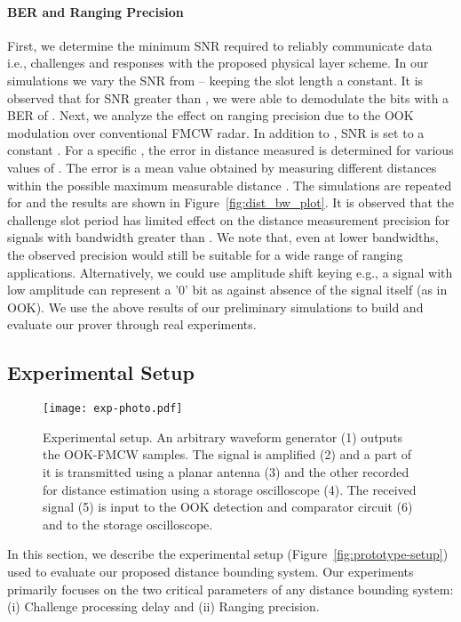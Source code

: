 \documentclass{sig-alternate-10pt}
\newcommand{\ie}{i.e.,\xspace}
\begin{document}
\paragraph{BER and Ranging Precision}
\label{sec:ber-ranging-precision}
First, we determine the minimum SNR required to reliably communicate data \ie
challenges and responses with the proposed physical layer scheme. In our
simulations we vary the SNR from -- keeping the slot length
 a constant. It is observed that for SNR greater than
, we were able to demodulate the bits with a BER of . Next,
we analyze the effect on ranging precision due to the OOK modulation over
conventional FMCW radar. In addition to , SNR is set to a constant
. For a specific , the error in distance measured is
determined for various values of . The error is a mean value obtained by
measuring  different distances within the possible maximum measurable
distance . The simulations are repeated for
 and the results are shown in
Figure~\ref{fig:dist_bw_plot}. It is observed that the challenge slot period
 has limited effect on the distance measurement precision for signals with
bandwidth greater than . We note that, even at lower bandwidths,
the observed precision would still be suitable for a wide range of ranging
applications. Alternatively, we could use amplitude shift keying e.g., a signal
with low amplitude can represent a '0' bit as against absence of the signal
itself (as in OOK). We use the above results of our preliminary simulations to
build and evaluate our prover through real experiments.

\subsection{Experimental Setup}
\label{sec:experimental-setup}

\begin{figure}[t]
  \centering
  \texttt{[image: exp-photo.pdf]}
  \caption{Experimental setup. An arbitrary waveform generator (1) outputs the
    OOK-FMCW samples. The signal is amplified (2) and a part of it is transmitted using a
    planar antenna (3) and the other recorded for distance estimation using a
    storage oscilloscope (4). The received signal (5) is input to the OOK
    detection and comparator circuit (6) and to the storage oscilloscope.}
  \label{fig:exp-photo}
\end{figure}

In this section, we describe the experimental setup
(Figure~\ref{fig:prototype-setup}) used to evaluate our proposed distance
bounding system. Our experiments primarily focuses on the two critical
parameters of any distance bounding system: (i) Challenge processing delay and
(ii) Ranging precision.
\end{document}
